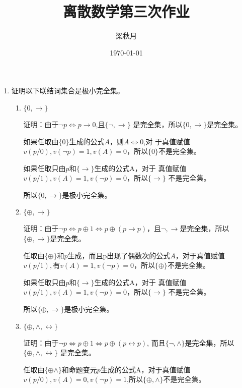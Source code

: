 \documentclass[UTF8]{ctexart}
\title{离散数学第三次作业}
\author{梁秋月}
\date{\today}
\begin{document}
   \maketitle
   \begin{enumerate}
        \item 证明以下联结词集合是极小完全集。
        \begin{enumerate}
           \item $\{0 , \rightarrow\}$
           
           证明：由于$\neg p\Leftrightarrow p\rightarrow 0$,且$\{\neg , \rightarrow\}$
           是完全集，所以$\{0, \rightarrow \}$是完全集。

           如果任取由$\{0\}$生成的公式$A$，则$A\Leftrightarrow 0$,对
           于真值赋值$v(p/0),v(\neg p)=1,v(A)=0$，所以$\{0\}$不是完全集。

           如果任取只由$p$和$\{\rightarrow \}$生成的公式A，对于
           真值赋值$v(p/1),v(A)=1,v(\neg p)=0$，所以$\{\rightarrow \}$
           不是完全集。

           所以$\{0 , \rightarrow\}$是极小完全集。

           \item $\{\oplus , \rightarrow\}$
           
            证明：由于$\neg p\Leftrightarrow p\oplus 1\Leftrightarrow p\oplus(p\rightarrow p)$，且$\neg,\rightarrow$是完全集，所以$\{\oplus,\rightarrow\}$是完全集。

            任取由$\{\oplus \}$和$p$生成，而且p出现了偶数次的公式$A$，对于真值赋值
            $v(p/1),有v(A)=1,v(\neg p)=0$，所以$\{\oplus \}$不是完全集。

            如果任取只由$p$和$\{\rightarrow \}$生成的公式A，对于
           真值赋值$v(p/1),v(A)=1,v(\neg p)=0$，所以$\{\rightarrow \}$
           不是完全集。

           所以$\{\oplus ,\rightarrow\}$是极小完全集。

           \item $\{\oplus , \wedge ,  \leftrightarrow \}$
           
           证明：由于$\neg p\Leftrightarrow p\oplus 1\Leftrightarrow p\oplus (p\leftrightarrow p)$,
           而且$\{\neg,\wedge \}$是完全集，所以$\{\oplus , \wedge ,  \leftrightarrow \}$
           是完全集。

           任取由$\{\oplus \wedge\}$和命题变元$p$生成的公式A，对于真值赋值
           $v(p/0),v(A)=0,v(\neg p)=1$,所以$\{\oplus, \wedge\}$不是完全集。


\end{enumerate}
\end{enumerate}
\end{document}
